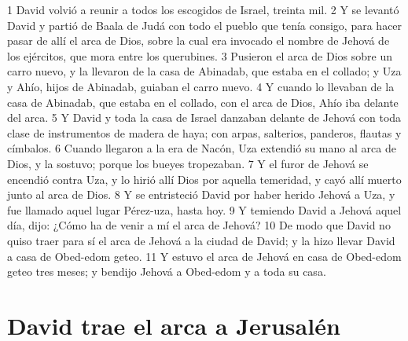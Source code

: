 1 David volvió a reunir a todos los escogidos de Israel, treinta mil.
2 Y se levantó David y partió de Baala de Judá con todo el pueblo que tenía consigo, para hacer pasar de allí el arca de Dios, sobre la cual era invocado el nombre de Jehová de los ejércitos, que mora entre los querubines. 
3 Pusieron el arca de Dios sobre un carro nuevo, y la llevaron de la casa de Abinadab, que estaba en el collado; y Uza y Ahío, hijos de Abinadab, guiaban el carro nuevo.
4 Y cuando lo llevaban de la casa de Abinadab, que estaba en el collado, con el arca de Dios, Ahío iba delante del arca.
5 Y David y toda la casa de Israel danzaban delante de Jehová con toda clase de instrumentos de madera de haya; con arpas, salterios, panderos, flautas y címbalos.
6 Cuando llegaron a la era de Nacón, Uza extendió su mano al arca de Dios, y la sostuvo; porque los bueyes tropezaban.
7 Y el furor de Jehová se encendió contra Uza, y lo hirió allí Dios por aquella temeridad, y cayó allí muerto junto al arca de Dios.
8 Y se entristeció David por haber herido Jehová a Uza, y fue llamado aquel lugar Pérez-uza, hasta hoy.
9 Y temiendo David a Jehová aquel día, dijo: ¿Cómo ha de venir a mí el arca de Jehová?
10 De modo que David no quiso traer para sí el arca de Jehová a la ciudad de David; y la hizo llevar David a casa de Obed-edom geteo.
11 Y estuvo el arca de Jehová en casa de Obed-edom geteo tres meses; y bendijo Jehová a Obed-edom y a toda su casa. 
\section*{David trae el arca a Jerusalén}

